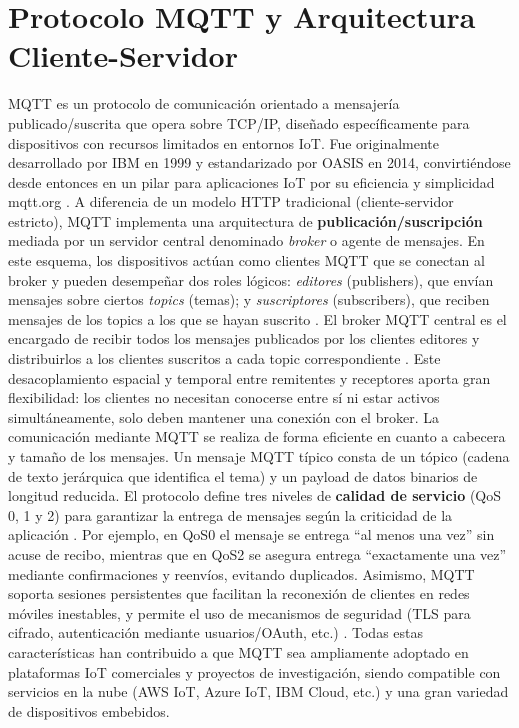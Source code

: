 \section{Protocolo MQTT y Arquitectura Cliente-Servidor}
MQTT es un protocolo de comunicación orientado a mensajería publicado/suscrita que opera sobre TCP/IP, diseñado específicamente para dispositivos con recursos limitados en entornos IoT. Fue originalmente desarrollado por IBM en 1999 y estandarizado por OASIS en 2014, convirtiéndose desde entonces en un pilar para aplicaciones IoT por su eficiencia y simplicidad
mqtt.org \cite{awsMQTT}. A diferencia de un modelo HTTP tradicional (cliente-servidor estricto), MQTT implementa una arquitectura de \textbf{publicación/suscripción} mediada por un servidor central denominado \textit{broker} o agente de mensajes. En este esquema, los dispositivos actúan como clientes MQTT que se conectan al broker y pueden desempeñar dos roles lógicos: \textit{editores} (publishers), que envían mensajes sobre ciertos \textit{topics} (temas); y \textit{suscriptores} (subscribers), que reciben mensajes de los topics a los que se hayan suscrito
\cite{awsMQTT}. El broker MQTT central es el encargado de recibir todos los mensajes publicados por los clientes editores y distribuirlos a los clientes suscritos a cada topic correspondiente
\cite{awsMQTT}. Este desacoplamiento espacial y temporal entre remitentes y receptores aporta gran flexibilidad: los clientes no necesitan conocerse entre sí ni estar activos simultáneamente, solo deben mantener una conexión con el broker. La comunicación mediante MQTT se realiza de forma eficiente en cuanto a cabecera y tamaño de los mensajes. Un mensaje MQTT típico consta de un tópico (cadena de texto jerárquica que identifica el tema) y un payload de datos binarios de longitud reducida. El protocolo define tres niveles de \textbf{calidad de servicio} (QoS 0, 1 y 2) para garantizar la entrega de mensajes según la criticidad de la aplicación
\cite{awsMQTT}. Por ejemplo, en QoS0 el mensaje se entrega “al menos una vez” sin acuse de recibo, mientras que en QoS2 se asegura entrega “exactamente una vez” mediante confirmaciones y reenvíos, evitando duplicados. Asimismo, MQTT soporta sesiones persistentes que facilitan la reconexión de clientes en redes móviles inestables, y permite el uso de mecanismos de seguridad (TLS para cifrado, autenticación mediante usuarios/OAuth, etc.)
\cite{mqttOrg}. Todas estas características han contribuido a que MQTT sea ampliamente adoptado en plataformas IoT comerciales y proyectos de investigación, siendo compatible con servicios en la nube (AWS IoT, Azure IoT, IBM Cloud, etc.) y una gran variedad de dispositivos embebidos.
